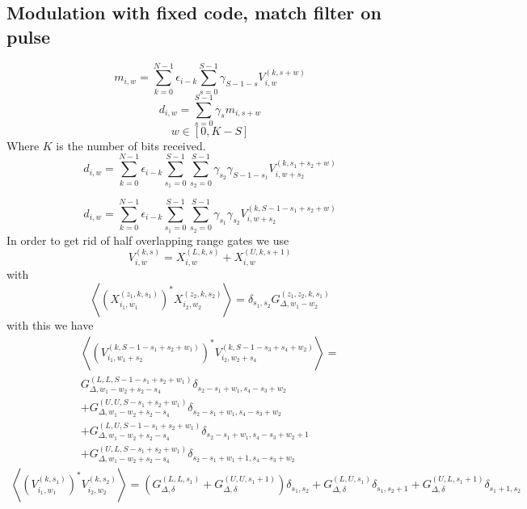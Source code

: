 \documentclass[18pt,a4paper]{extarticle}
\begin{document}
\subsection{Modulation with fixed code, match filter on pulse}
\begin{equation}
m_{i,w} = \sum_{k=0}^{N-1} \epsilon_{i-k} \sum_{s=0}^{S-1} \gamma_{S-1-s} V^{(k, s + w)}_{i, w}
\end{equation}
\begin{equation}
d_{i,w} = \sum^{S-1}_{s=0} \gamma_{s} m_{i, s + w}
\end{equation}
\begin{equation}
w \in [0, K - S]
\end{equation}
Where $K$ is the number of bits received.
\begin{equation}
d_{i,w} = \sum_{k=0}^{N-1}\epsilon_{i-k} \sum_{s_1=0}^{S-1} \sum^{S-1}_{s_2=0} \gamma_{s_2} \gamma_{S-1-s_1} V_{i,w+s_2}^{(k, s_1 + s_2 + w)}
\end{equation}

\begin{equation}
d_{i,w} = \sum_{k=0}^{N-1}\epsilon_{i-k} \sum_{s_1=0}^{S-1} \sum^{S-1}_{s_2=0} \gamma_{s_1} \gamma_{s_2} V_{i,w+s_2}^{(k, S - 1 - s_1 + s_2 + w)}
\end{equation}
In order to get rid of half overlapping range gates we use
\begin{equation}
V^{(k,s)}_{i,w} = X^{(L, k, s)}_{i,w} + X^{(U, k, s + 1)}_{i,w}
\end{equation}
with
\begin{equation}
\left\langle \left( X^{(z_1, k, s_1)}_{i_1,w_1} \right)^* X^{(z_2, k, s_2)}_{i_2,w_2} \right\rangle = \delta_{s_1,s_2}G^{(z_1, z_2, k, s_1)}_{\Delta, w_1 - w_2}
\end{equation}
with this we have
\begin{align}
\left \langle \left(V_{i_1,w_1+s_2}^{(k, S - 1 - s_1 + s_2 + w_1)} \right)^* V_{i_2,w_2+s_4}^{(k, S - 1 - s_3 + s_4 + w_2)} \right\rangle =\\
G^{(L, L, S-1-s_1+s_2+w_1)}_{\Delta, w_1 - w_2 + s_2 - s_4} \delta_{s_2 - s_1 + w_1, s_4 - s_3 + w_2}\\
+G^{(U, U, S-s_1+s_2+w_1)}_{\Delta, w_1 - w_2 + s_2 - s_4} \delta_{s_2 - s_1 + w_1, s_4 - s_3 + w_2}\\
+G^{(L, U, S-1-s_1+s_2+w_1)}_{\Delta, w_1 - w_2 + s_2 - s_4} \delta_{s_2 - s_1 + w_1, s_4 - s_3 + w_2 + 1}\\
+G^{(U, L, S-s_1+s_2+w_1)}_{\Delta, w_1 - w_2 + s_2 - s_4} \delta_{s_2 - s_1 + w_1 + 1, s_4 - s_3 + w_2}
\end{align}
\begin{align}
\left \langle \left(V_{i_1,w_1}^{(k, s_1)} \right)^* V_{i_2,w_2}^{(k, s_2)} \right\rangle=
\left( G^{(L, L, s_1)}_{\Delta, \delta} + G^{(U, U, s_1 + 1)}_{\Delta, \delta} \right) \delta_{s_1, s_2} + G^{(L, U, s_1)}_{\Delta, \delta} \delta_{s_1, s_2 + 1} + G^{(U, L, s_1 + 1)}_{\Delta, \delta} \delta_{s_1 + 1, s_2}
\end{align}
\end{document}
